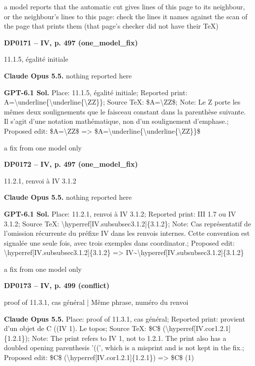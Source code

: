 a model reports that the automatic cut gives lines of this page to its neighbour, or the neighbour's lines to this page: check the lines it names against the scan of the page that prints them (that page's checker did not have their TeX)\par
\par\noindent\hypertarget{DP0171}{}\textbf{DP0171 -- IV, p. 497 (one\_model\_fix)}\par
11.1.5, égalité initiale\par
\textbf{Claude Opus 5.5.} nothing reported here\par
\textbf{GPT-6.1 Sol.} Place: 11.1.5, égalité initiale; Reported print: A=\allowbreak \textbackslash{}underline\{\textbackslash{}underline\{\textbackslash{}ZZ\}\}; Source TeX: \$A=\allowbreak \textbackslash{}ZZ\$; Note: Le Z porte les mêmes deux soulignements que le faisceau constant dans la parenthèse suivante. Il s'agit d'une notation mathématique, non d'un soulignement d'emphase.; Proposed edit: \$A=\allowbreak \textbackslash{}ZZ\$ =\allowbreak > \$A=\allowbreak \textbackslash{}underline\{\textbackslash{}underline\{\textbackslash{}ZZ\}\}\$\par
a fix from one model only\par
\par\noindent\hypertarget{DP0172}{}\textbf{DP0172 -- IV, p. 497 (one\_model\_fix)}\par
11.2.1, renvoi à IV 3.1.2\par
\textbf{Claude Opus 5.5.} nothing reported here\par
\textbf{GPT-6.1 Sol.} Place: 11.2.1, renvoi à IV 3.1.2; Reported print: III 1.7 ou IV 3.1.2; Source TeX: \textbackslash{}hyperref[IV.subsubsec3.1.2]\{3.1.2\}; Note: Cas représentatif de l'omission récurrente du préfixe IV dans les renvois internes. Cette convention est signalée une seule fois, avec trois exemples dans coordinator.; Proposed edit: \textbackslash{}hyperref[IV.subsubsec3.1.2]\{3.1.2\} =\allowbreak > IV\textasciitilde{}\textbackslash{}hyperref[IV.subsubsec3.1.2]\{3.1.2\}\par
a fix from one model only\par
\par\noindent\hypertarget{DP0173}{}\textbf{DP0173 -- IV, p. 499 (conflict)}\par
proof of 11.3.1, cas général | Même phrase, numéro du renvoi\par
\textbf{Claude Opus 5.5.} Place: proof of 11.3.1, cas général; Reported print: provient d'un objet de C ((IV 1). Le topos; Source TeX: \$C\$ (\textbackslash{}hyperref[IV.cor1.2.1]\{1.2.1\}); Note: The print refers to IV 1, not to 1.2.1. The print also has a doubled opening parenthesis '((', which is a misprint and is not kept in the fix.; Proposed edit: \$C\$ (\textbackslash{}hyperref[IV.cor1.2.1]\{1.2.1\}) =\allowbreak > \$C\$ (1)\par
